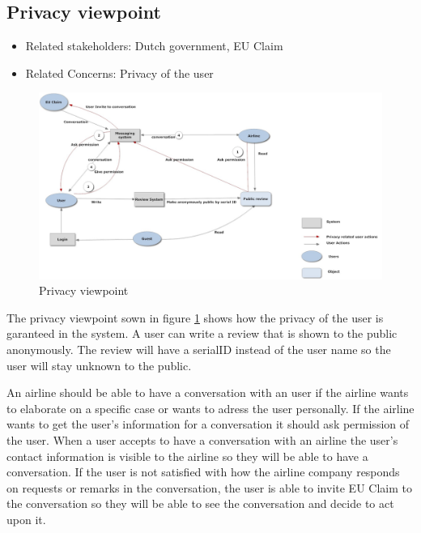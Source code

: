 % 

\subsection{Privacy viewpoint}

\begin{itemize}
\item Related stakeholders: Dutch government, EU Claim
\item Related Concerns: Privacy of the user
\end{itemize}

\begin{figure}
\includegraphics[width=600px, angle =90]{privacyview}
\caption{Privacy viewpoint}
\label{fig:privacy}
\end{figure}

The privacy viewpoint sown in figure \ref{fig:privacy} shows how the privacy of the user is garanteed in the system. A user can write a review that is shown to the public anonymously. The review will have a serialID instead of the user name so the user will stay unknown to the public. 

An airline should be able to have a conversation with an user if the airline wants to elaborate on a specific case or wants to adress the user personally. If the airline wants to get the user's information for a conversation it should ask permission of the user. When a user accepts to have a conversation with an airline the user's contact information is visible to the airline so they will be able to have a conversation. If the user is not satisfied with how the airline company responds on requests or remarks in the conversation, the user is able to invite EU Claim to the conversation so they will be able to see the conversation and decide to act upon it.